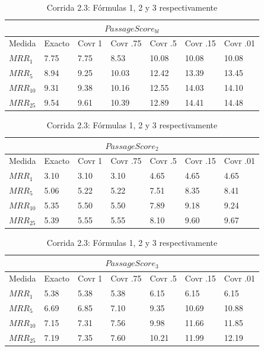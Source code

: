 \begin{table}
\centering
\begin{center}

\begin{tabular}{|l | l | l | l | l | l | l |}
\hline
\multicolumn{7}{|c|}{$PassageScore_{bl}$}  \\ \hline
Medida & Exacto & Covr 1 & Covr .75 & Covr .5 & Covr .15 & Covr .01 \\ \hline
$MRR_{1}$ & 7.75 & 7.75 & 8.53 & 10.08 & 10.08 & 10.08  \\ \hline
$MRR_{5}$ & 8.94 & 9.25 & 10.03 & 12.42 & 13.39 & 13.45  \\ \hline
$MRR_{10}$ & 9.31 & 9.38 & 10.16 & 12.55 & 14.03 & 14.10  \\ \hline
$MRR_{25}$ & 9.54 & 9.61 & 10.39 & 12.89 & 14.41 & 14.48  \\ \hline
\end{tabular}

\medskip

\begin{tabular}{|l | l | l | l | l | l | l |}
\hline
\multicolumn{7}{|c|}{$PassageScore_2$}  \\ \hline
Medida & Exacto & Covr 1 & Covr .75 & Covr .5 & Covr .15 & Covr .01 \\ \hline
$MRR_{1}$ & 3.10 & 3.10 & 3.10 & 4.65 & 4.65 & 4.65  \\ \hline
$MRR_{5}$ & 5.06 & 5.22 & 5.22 & 7.51 & 8.35 & 8.41  \\ \hline
$MRR_{10}$ & 5.35 & 5.50 & 5.50 & 7.89 & 9.18 & 9.24  \\ \hline
$MRR_{25}$ & 5.39 & 5.55 & 5.55 & 8.10 & 9.60 & 9.67  \\ \hline
\end{tabular}


\medskip


\begin{tabular}{|l | l | l | l | l | l | l |}
\hline
\multicolumn{7}{|c|}{$PassageScore_3$}  \\ \hline
Medida & Exacto & Covr 1 & Covr .75 & Covr .5 & Covr .15 & Covr .01 \\ \hline
$MRR_{1}$ & 5.38 & 5.38 & 5.38 & 6.15 & 6.15 & 6.15  \\ \hline
$MRR_{5}$ & 6.69 & 6.85 & 7.10 & 9.35 & 10.69 & 10.88  \\ \hline
$MRR_{10}$ & 7.15 & 7.31 & 7.56 & 9.98 & 11.66 & 11.85  \\ \hline
$MRR_{25}$ & 7.19 & 7.35 & 7.60 & 10.21 & 11.99 & 12.19  \\ \hline
\end{tabular}


\caption{Corrida 2.3: Fórmulas 1, 2 y 3 respectivamente}
\label{table:2_3_40_getExactMRRWikiFactoid_getCovrMRRWikiFactoidq}
\end{center}
\end{table}



